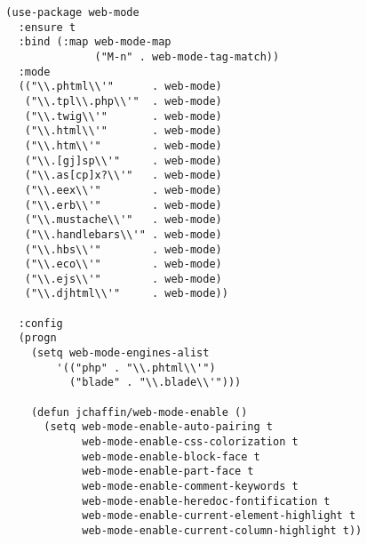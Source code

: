 \documentclass[11pt]{article}
\begin{document}
\begin{verbatim}
  (use-package web-mode
    :ensure t
    :bind (:map web-mode-map
                ("M-n" . web-mode-tag-match))
    :mode
    (("\\.phtml\\'"      . web-mode)
     ("\\.tpl\\.php\\'"  . web-mode)
     ("\\.twig\\'"       . web-mode)
     ("\\.html\\'"       . web-mode)
     ("\\.htm\\'"        . web-mode)
     ("\\.[gj]sp\\'"     . web-mode)
     ("\\.as[cp]x?\\'"   . web-mode)
     ("\\.eex\\'"        . web-mode)
     ("\\.erb\\'"        . web-mode)
     ("\\.mustache\\'"   . web-mode)
     ("\\.handlebars\\'" . web-mode)
     ("\\.hbs\\'"        . web-mode)
     ("\\.eco\\'"        . web-mode)
     ("\\.ejs\\'"        . web-mode)
     ("\\.djhtml\\'"     . web-mode))

    :config
    (progn
      (setq web-mode-engines-alist
          '(("php" . "\\.phtml\\'")
            ("blade" . "\\.blade\\'")))

      (defun jchaffin/web-mode-enable ()
        (setq web-mode-enable-auto-pairing t
              web-mode-enable-css-colorization t
              web-mode-enable-block-face t
              web-mode-enable-part-face t
              web-mode-enable-comment-keywords t
              web-mode-enable-heredoc-fontification t
              web-mode-enable-current-element-highlight t
              web-mode-enable-current-column-highlight t))


\end{verbatim}
\end{document}
